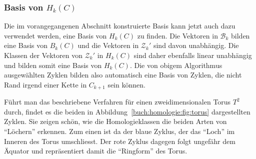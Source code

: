 \subsubsection{Basis von $H_k(C)$}
Die im vorangegangenen Abschnitt konstruierte Basis kann jetzt auch
dazu verwendet werden, eine Basis von $H_k(C)$ zu finden.
Die Vektoren in $\mathcal{B}_k$ bilden eine Basis von $B_k(C)$
und die Vektoren in $\mathcal{Z}_k'$ sind davon unabhängig.
Die Klassen der Vektoren von $\mathcal{Z}_k'$ in $H_k(C)$ sind
daher ebenfalls linear unabhängig und bilden somit eine Basis
von $H_k(C)$.
Die von obigem Algorithmus ausgewählten Zyklen bilden also automatisch
eine Basis von Zyklen, die nicht Rand irgend einer Kette in $C_{k+1}$
sein können.


Führt man das beschriebene Verfahren für einen zweidimensionalen Torus $T^2$ durch,
findet es die beiden in Abbildung~\ref{buch:homologie:fig:torus} dargestellten
Zyklen.
Sie zeigen schön, wie die Homologieklassen die beiden Arten von ``Löchern''
erkennen.
Zum einen ist da der blaue Zyklus, der das ``Loch'' im Inneren des Torus
umschliesst.
Der rote Zyklus dagegen folgt ungefähr dem Äquator und repräsentiert
damit die ``Ringform'' des Torus.

